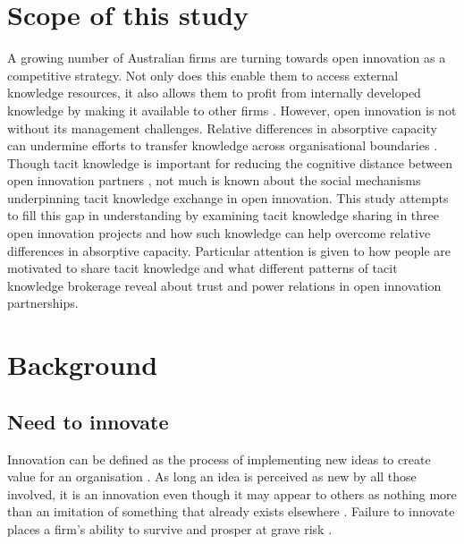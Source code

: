 
\section{Scope of this study}

A growing number of Australian firms are turning towards open innovation as a competitive strategy. Not only does this enable them to access external knowledge resources, it also allows them to profit from internally developed knowledge by making it available to other firms \citep{chesbrough2003open}. However, open innovation is not without its management challenges. Relative differences in absorptive capacity can undermine efforts to transfer knowledge across organisational boundaries \citep{nooteboom2000learning}. Though tacit knowledge is important for reducing the cognitive distance between open innovation partners \citep{nonaka1994dynamic,carlile2004transferring,collins2006leveraging,lichtenthaler2016absorptive}, not much is known about the social mechanisms underpinning tacit knowledge exchange in open innovation. This study attempts to fill this gap in understanding by examining tacit knowledge sharing in three open innovation projects and how such knowledge can help overcome relative differences in absorptive capacity. Particular attention is given to how people are motivated to share tacit knowledge and what different patterns of tacit knowledge brokerage reveal about trust and power relations in open innovation partnerships. \medskip

\section{Background}

\subsection{Need to innovate}

Innovation can be defined as the process of implementing new ideas to create value for an organisation \citep{schumpeter1950capitalism}. As long an idea is perceived as new by all those involved, it is an innovation even though it may appear to others as nothing more than an imitation of something that already exists elsewhere \citep{van1986central}. Failure to innovate places a firm’s ability to survive and prosper at grave risk \citep{bessant2005managing}. \medskip

